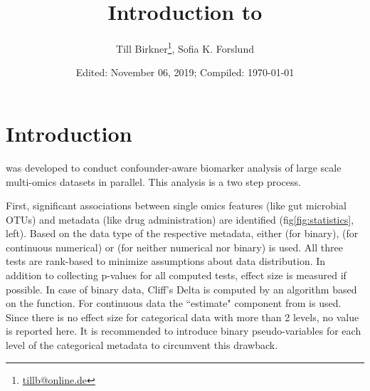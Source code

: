 \documentclass{article}\usepackage[]{graphicx}\usepackage[usenames,dvipsnames]{color}
\title{Introduction to \metadeconfoundR}
\author{Till Birkner\footnote{\url{tillb@online.de}}, Sofia K. Forslund}
\date{Edited: November 06, 2019; Compiled: \today}
\begin{document}
\maketitle

\tableofcontents

\section{Introduction}
 was developed to conduct confounder-aware biomarker analysis of large scale multi-omics datasets in parallel. This analysis is a two step process. 

First, significant associations between single omics features (like gut microbial OTUs) and metadata (like drug administration) are identified (fig\ref{fig:statistics}, left). Based on the data type of the respective metadata, either  (for binary),  (for continuous numerical) or  (for neither numerical nor binary) is used. All three tests are rank-based to minimize assumptions about data distribution.
In addition to collecting p-values for all computed tests, effect size is measured if possible. In case of binary data, Cliff's Delta is computed by an algorithm based on the  function. For continuous data the ``estimate" component from  is used. Since there is no effect size for categorical data with more than 2 levels, no value is reported here. It is recommended to introduce binary pseudo-variables for each level of the categorical metadata to circumvent this drawback.
    
\end{document}
